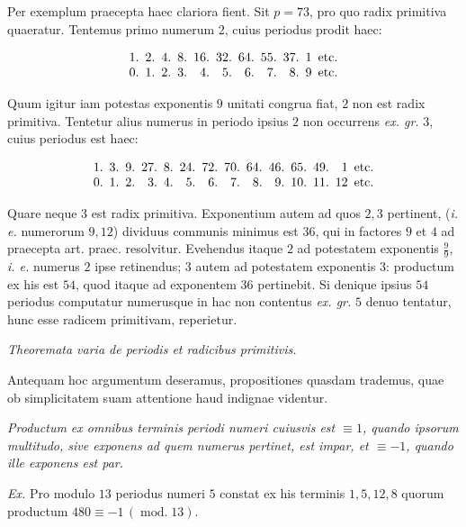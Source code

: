 
Per exemplum praecepta haec clariora fient. Sit $p=73$, pro quo radix primitiva quaeratur. Tentemus primo numerum $2$, cuius periodus prodit haec:

\[\setlength{\arraycolsep}{2.5pt}\begin{array}{@{}rrrrrrrrrrl@{}}
1.&2.&4.&8.&16.&32.&64.&55.&37.&1&\text{etc.}\\
0.&1.&2.&3.&4.&5.&6.&7.&8.&9&\text{etc.}
\end{array}\]

Quum igitur iam potestas exponentis $9$ unitati congrua fiat, $2$ non est radix primitiva. Tentetur alius numerus in periodo ipsius $2$ non occurrens \emph{ex. gr.} $3$, cuius periodus est haec:

\[\setlength{\arraycolsep}{2.5pt}\begin{array}{@{}rrrrrrrrrrrrrl@{}}
1.&3.&9.&27.&8.&24.&72.&70.&64.&46.&65.&49.&1&\text{etc.}\\
0.&1.&2.&3.&4.&5.&6.&7.&8.&9.&10.&11.&12&\text{etc.}
\end{array}\]

Quare neque $3$ est radix primitiva. Exponentium autem ad quos $2,3$ pertinent, (\emph{i. e.} numerorum $9,12$) dividuus communis minimus est $36$, qui in factores $9$ et $4$ ad praecepta art. praec. resolvitur. Evehendus itaque $2$ ad potestatem exponentis $\frac{9}{9}$, \emph{i. e.} numerus $2$ ipse retinendus; $3$ autem ad potestatem exponentis $3$: productum ex his est $54$, quod itaque ad exponentem $36$ pertinebit. Si denique ipsius $54$ periodus computatur numerusque in hac non contentus \emph{ex. gr.} $5$ denuo tentatur, hunc esse radicem primitivam, reperietur.

\begin{center}\emph{Theoremata varia de periodis et radicibus primitivis.}\end{center}


Antequam hoc argumentum deseramus, propositiones quasdam trademus, quae ob simplicitatem suam attentione haud indignae videntur.

\emph{Productum ex omnibus terminis periodi numeri cuiusvis est $\equiv1$, quando ipsorum multitudo, sive exponens ad quem numerus pertinet, est impar, et $\equiv-1$, quando ille exponens est par.}

\emph{Ex.} Pro modulo $13$ periodus numeri $5$ constat ex his terminis $1,5,12,8$ quorum productum $480\equiv-1\,(\operatorname{mod.}13)$.

